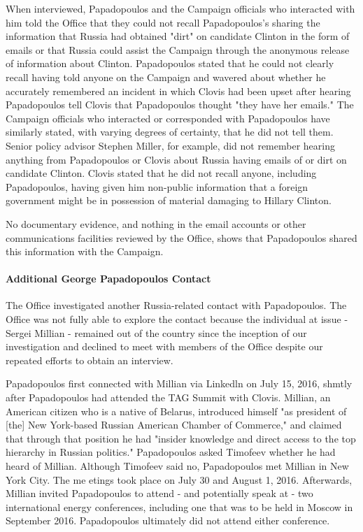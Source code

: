 When interviewed, Papadopoulos and the Campaign officials who interacted with him told the Office that they could not recall Papadopoulos's sharing the information that Russia had obtained "dirt" on candidate Clinton in the form of emails or that Russia could assist the Campaign through the anonymous release of information about Clinton.
Papadopoulos stated that he could not clearly recall having told anyone on the Campaign and wavered about whether he accurately remembered an incident in which Clovis had been upset after hearing Papadopoulos tell Clovis that Papadopoulos thought "they have her emails."%
The Campaign officials who interacted or corresponded with Papadopoulos have similarly stated, with varying degrees of certainty, that he did not tell them.
Senior policy advisor Stephen Miller, for example, did not remember hearing anything from Papadopoulos or Clovis about Russia having emails of or dirt on candidate Clinton.%
Clovis stated that he did not recall anyone, including Papadopoulos, having given him non-public information that a foreign government might be in possession of material damaging to Hillary Clinton.%


No documentary evidence, and nothing in the email accounts or other communications facilities reviewed by the Office, shows that Papadopoulos shared this information with the Campaign.

\paragraph{Additional George Papadopoulos Contact}

The Office investigated another Russia-related contact with Papadopoulos.
The Office was not fully able to explore the contact because the individual at issue - Sergei Millian - remained out of the country since the inception of our investigation and declined to meet with members of the Office despite our repeated efforts to obtain an interview.

Papadopoulos first connected with Millian via Linkedln on July 15, 2016, shmtly after Papadopoulos had attended the TAG Summit with Clovis.%
Millian, an American citizen who is a native of Belarus, introduced himself "as president of [the] New York-based Russian American Chamber of Commerce," and claimed that through that position he had "insider knowledge and direct access to the top hierarchy in Russian politics."%
Papadopoulos asked Timofeev whether he had heard of Millian.%
Although Timofeev said no,%
Papadopoulos met Millian in New York City.%
The me etings took place on July 30 and August 1, 2016.%
Afterwards, Millian invited Papadopoulos to attend - and potentially speak at - two international energy conferences, including one that was to be held in Moscow in September 2016.%
Papadopoulos ultimately did not attend either conference.

